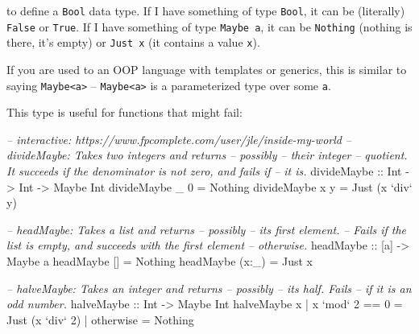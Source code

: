\documentclass[]{article}
\newenvironment{Shaded}{}{}
\newcommand{\DataTypeTok}[1]{\textcolor[rgb]{0.56,0.13,0.00}{{#1}}}
\newcommand{\DecValTok}[1]{\textcolor[rgb]{0.25,0.63,0.44}{{#1}}}
\newcommand{\CommentTok}[1]{\textcolor[rgb]{0.38,0.63,0.69}{\textit{{#1}}}}
\newcommand{\OtherTok}[1]{\textcolor[rgb]{0.00,0.44,0.13}{{#1}}}
\newcommand{\FunctionTok}[1]{\textcolor[rgb]{0.02,0.16,0.49}{{#1}}}
\newcommand{\NormalTok}[1]{{#1}}
\begin{document}
to define a \texttt{Bool} data type. If I have something of type
\texttt{Bool}, it can be (literally) \texttt{False} or \texttt{True}. If
I have something of type \texttt{Maybe\ a}, it can be \texttt{Nothing}
(nothing is there, it's empty) or \texttt{Just\ x} (it contains a value
\texttt{x}).

If you are used to an OOP language with templates or generics, this is
similar to saying \texttt{Maybe\textless{}a\textgreater{}} --
\texttt{Maybe\textless{}a\textgreater{}} is a parameterized type over
some \texttt{a}.

This type is useful for functions that might fail:

\begin{Shaded}
\begin{Highlighting}[]
\CommentTok{-- interactive: https://www.fpcomplete.com/user/jle/inside-my-world}
\CommentTok{-- divideMaybe: Takes two integers and returns -- possibly -- their integer}
\CommentTok{--      quotient. It succeeds if the denominator is not zero, and fails if}
\CommentTok{--      it is.}
\OtherTok{divideMaybe ::} \DataTypeTok{Int} \OtherTok{->} \DataTypeTok{Int} \OtherTok{->} \DataTypeTok{Maybe} \DataTypeTok{Int}
\NormalTok{divideMaybe _ }\DecValTok{0} \FunctionTok{=} \DataTypeTok{Nothing}
\NormalTok{divideMaybe x y }\FunctionTok{=} \DataTypeTok{Just} \NormalTok{(x }\OtherTok{`div`} \NormalTok{y)}

\CommentTok{-- headMaybe: Takes a list and returns -- possibly -- its first element.}
\CommentTok{--      Fails if the list is empty, and succeeds with the first element}
\CommentTok{--      otherwise.}
\OtherTok{headMaybe ::} \NormalTok{[a] }\OtherTok{->} \DataTypeTok{Maybe} \NormalTok{a}
\NormalTok{headMaybe []    }\FunctionTok{=} \DataTypeTok{Nothing}
\NormalTok{headMaybe (x}\FunctionTok{:}\NormalTok{_) }\FunctionTok{=} \DataTypeTok{Just} \NormalTok{x}

\CommentTok{-- halveMaybe: Takes an integer and returns -- possibly -- its half.  Fails}
\CommentTok{--      if it is an odd number.}
\OtherTok{halveMaybe ::} \DataTypeTok{Int} \OtherTok{->} \DataTypeTok{Maybe} \DataTypeTok{Int}
\NormalTok{halveMaybe x }\FunctionTok{|} \NormalTok{x }\OtherTok{`mod`} \DecValTok{2} \FunctionTok{==} \DecValTok{0} \FunctionTok{=} \DataTypeTok{Just} \NormalTok{(x }\OtherTok{`div`} \DecValTok{2}\NormalTok{)}
             \FunctionTok{|} \NormalTok{otherwise      }\FunctionTok{=} \DataTypeTok{Nothing}
\end{Highlighting}
\end{Shaded}
\end{document}
